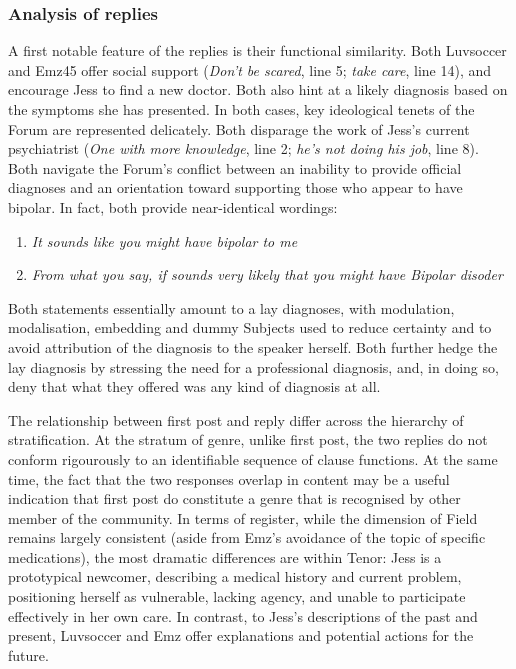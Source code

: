 \documentclass{article}
\begin{document}
\subsubsection{Analysis of replies} \label{sect:qual-reply-analysis}

A first notable feature of the replies is their functional similarity. Both Luvsoccer and Emz45 offer social support (\emph{Don't be scared}, line 5; \emph{take care}, line 14), and encourage Jess to find a new doctor. Both also hint at a likely diagnosis based on the symptoms she has presented. In both cases, key ideological tenets of the Forum are represented delicately. Both disparage the work of Jess's current psychiatrist (\emph{One with more knowledge}, line 2; \emph{he's not doing his job}, line 8). Both navigate the Forum's conflict between an inability to provide official diagnoses and an orientation toward supporting those who appear to have bipolar. In fact, both provide near-identical wordings:

\begin{enumerate}
\item \emph{It sounds like you might have bipolar to me}
\item \emph{From what you say, if sounds very likely that you might have Bipolar disoder}
\end{enumerate}
%
Both statements essentially amount to a lay diagnoses, with modulation, modalisation, embedding and dummy Subjects used to reduce certainty and to avoid attribution of the diagnosis to the speaker herself. Both further hedge the lay diagnosis by stressing the need for a professional diagnosis, and, in doing so, deny that what they offered was any kind of diagnosis at all.

The relationship between first post and reply differ across the hierarchy of stratification. At the stratum of genre, unlike first post, the two replies do not conform rigourously to an identifiable sequence of clause functions. At the same time, the fact that the two responses overlap in content may be a useful indication that first post do constitute a genre that is recognised by other member of the community. In terms of register, while the dimension of Field remains largely consistent (aside from Emz's avoidance of the topic of specific medications), the most dramatic differences are within Tenor: Jess is a prototypical newcomer, describing a medical history and current problem, positioning herself as vulnerable, lacking agency, and unable to participate effectively in her own care. In contrast, to Jess's descriptions of the past and present, Luvsoccer and Emz offer explanations and potential actions for the future. 
\end{document}

